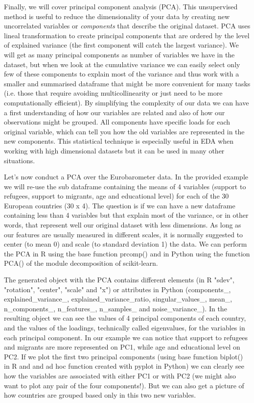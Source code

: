Finally, we will cover principal component analysis (PCA). This unsupervised method is useful to reduce the dimensionality of your data by creating new uncorrelated variables or \textit{components} that describe the original dataset. PCA uses lineal transformation to create principal components that are ordered by the level of explained variance (the first component will catch the largest variance). We will get as many principal components as number of variables we have in the dataset, but when we look at the cumulative variance we can easily select only few of these components to explain most of the variance and thus work with a smaller and summarised dataframe that might be more convenient for many tasks (i.e. those that require avoiding multicollinearity or just need to be more computationally efficient). By simplifying the complexity of our data we can have a first understanding of how our variables are related and also of how our observations might be grouped. All components have specific loads for each original variable, which can tell you how the old variables are represented in the new components. This statistical technique is especially useful in EDA when working with high dimensional datasets but it can be used in many other situations.  

Let's now conduct a PCA over the Eurobarometer data.  In the provided example we will re-use the sub dataframe containing the means of 4 variables (support to refugees, support to migrants, age and educational level) for each of the 30 European countries (30 x 4). The question is if we can have a new dataframe containing less than 4 variables but that explain most of the variance, or in other words, that represent well our original dataset with less dimensions. As long as our features are usually measured in different scales, it is normally suggested to center (to mean 0) and scale (to standard deviation 1) the data. We can perform the PCA in R using the base function prcomp() and in Python using the function PCA() of the module decomposition of scikit-learn. 


The generated object with the PCA contains different elements (in R "sdev",     "rotation", "center",  "scale" and   "x") or attributes in Python (components\_, explained\_variance\_, explained\_variance\_ratio, singular\_values\_, mean\_, n\_components\_, n\_features\_, n\_samples\_ and noise\_variance\_). In the resulting object we can see the values of 4 principal components of each country, and the values of the loadings, technically called eigenvalues, for the variables in each principal component. In our example we can notice that support to refugees and migrants are more represented on PC1, while age and educational level on PC2. If we plot the first two principal components (using base function biplot() in R and and ad hoc function created with pyplot in Python) we can clearly see how the variables are associated with either PC1 or with PC2 (we might also want to plot any pair of the four components!). But we can also get a picture of how countries are grouped based only in this two new variables.

